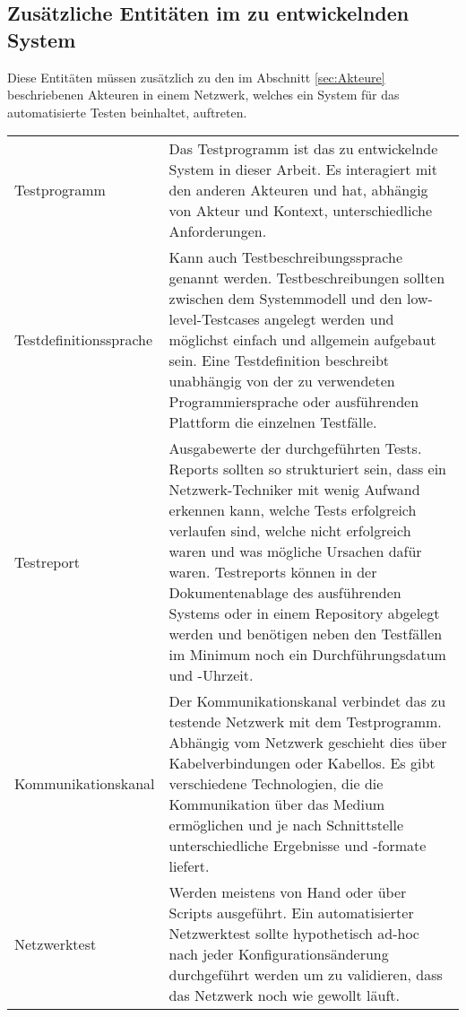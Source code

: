 \documentclass[
	ngerman,
	toc=listof, %
	toc=bibliography, %
	footnotes=multiple, %
	parskip=half, %
	numbers=noendperiod %
]{scrartcl}
\begin{document}
	\subsection{Zusätzliche Entitäten im zu entwickelnden System}
	Diese Entitäten müssen zusätzlich zu den im Abschnitt \ref{sec:Akteure} beschriebenen Akteuren in einem Netzwerk, welches ein System für das automatisierte Testen beinhaltet, auftreten.
	
		\begin{tabularx}{\textwidth}{lX}
			\toprule
			Testprogramm &  Das Testprogramm ist das zu entwickelnde System in dieser Arbeit. Es interagiert mit den anderen Akteuren und hat, abhängig von Akteur und Kontext, unterschiedliche Anforderungen. \\
			Testdefinitionssprache & Kann auch Testbeschreibungssprache genannt werden. Testbeschreibungen sollten zwischen dem Systemmodell und den low-level-Testcases angelegt werden und möglichst einfach und allgemein aufgebaut sein. Eine Testdefinition beschreibt unabhängig von der zu verwendeten Programmiersprache oder ausführenden Plattform die einzelnen Testfälle. \\
			Testreport & Ausgabewerte der durchgeführten Tests. Reports sollten so strukturiert sein, dass ein Netzwerk-Techniker mit wenig Aufwand erkennen kann, welche Tests erfolgreich verlaufen sind, welche nicht erfolgreich waren und was mögliche Ursachen dafür waren. Testreports können in der Dokumentenablage des ausführenden Systems oder in einem Repository abgelegt werden und benötigen neben den Testfällen im Minimum noch ein Durchführungsdatum und -Uhrzeit. \\
			\midrule
			Kommunikationskanal & Der Kommunikationskanal verbindet das zu testende Netzwerk mit dem Testprogramm. Abhängig vom Netzwerk geschieht dies über Kabelverbindungen oder Kabellos. Es gibt verschiedene Technologien, die die Kommunikation über das Medium ermöglichen und je nach Schnittstelle unterschiedliche Ergebnisse und -formate liefert. \\
			Netzwerktest & Werden meistens von Hand oder über Scripts ausgeführt. Ein automatisierter Netzwerktest sollte hypothetisch ad-hoc nach jeder Konfigurationsänderung durchgeführt werden um zu validieren, dass das Netzwerk noch wie gewollt läuft. \\
			\bottomrule
		\end{tabularx}
		\newpage
\end{document}
